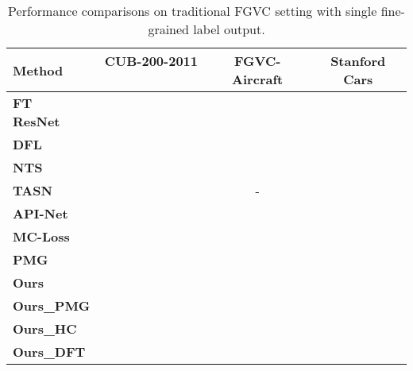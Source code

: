 \documentclass[final]{cvpr}
\begin{document}
\begin{table}[t]
  \centering
  \footnotesize

\begin{adjustbox}{width=\linewidth,center}
\begin{tabular}{l@{}c@{}c@{}c}
    \hline
    \textbf{Method   }                                      & \textbf{CUB-200-2011}      \        &\textbf{ FGVC-Aircraft }                &\textbf{ Stanford Cars }   \\
    \hline
    \hline
    \textbf{FT ResNet}~\cite{wang2018learning}                  &                                             &                         &             \\
    \textbf{DFL}~\cite{wang2018learning}                    &                                             &                         &              \\
    \textbf{NTS}~\cite{yang2018learning}                    &                                             &                         &    \\
    \textbf{TASN}~\cite{Zheng_2019_CVPR}                      &                                             &      -                        &                   \\
    \textbf{API-Net}~\cite{zhuang2020learning}                  &                                             &                         &    \\    
    \textbf{MC-Loss}~\cite{chang2020mc}                         &                                             &                         &   \\   
    \textbf{PMG}~\cite{du2020fine}                             &                        &    &    \\   
    \hline
    \hline

    \textbf{Ours  }                                                      &                                               &                          &    \\   
    \textbf{Ours\_PMG }                                                  &                                &           &         \\  
    \hline
    \hline
    \textbf{Ours\_HC }                                                  &             &                 &        \\   
    \textbf{Ours\_DFT }                                                 &             &               &       \\   
    \hline
    \end{tabular}\end{adjustbox}
  \caption{Performance comparisons on traditional FGVC setting with single fine-grained label output.}
  \label{tab:SOTA}\vspace{-6mm}
\end{table}
\end{document}
